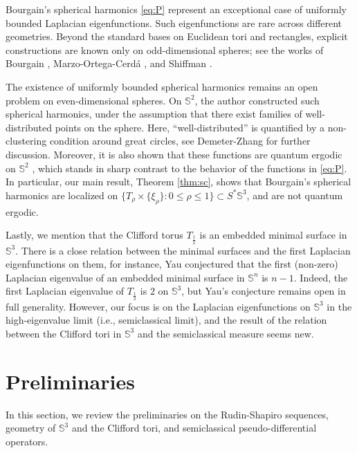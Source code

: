 \documentclass[12pt,reqno]{amsart}
\newcommand\Sb{\mathbb{S}}
\theoremstyle{plain}
\theoremstyle{remark}
\numberwithin{equation}{section}
\begin{document}
Bourgain’s spherical harmonics \eqref{eq:P} represent an exceptional case of uniformly bounded Laplacian eigenfunctions. Such eigenfunctions are rare across different geometries. Beyond the standard bases on Euclidean tori and rectangles, explicit constructions are known only on odd-dimensional spheres; see the works of Bourgain \cite{B1, B2}, Marzo-Ortega-Cerd\'a \cite{MOC}, and Shiffman \cite{Sh}. 

The existence of uniformly bounded spherical harmonics remains an open problem on even-dimensional spheres. On $\Sb^2$, the author \cite{H} constructed such spherical harmonics, under the assumption that there exist families of well-distributed points on the sphere. Here, ``well-distributed'' is quantified by a non-clustering condition around great circles, see Demeter-Zhang \cite{DZ} for further discussion. Moreover, it is also shown that these functions are quantum ergodic on $\Sb^2$ \cite{H}, which stands in sharp contrast to the behavior of the functions in \eqref{eq:P}. In particular,
our main result, Theorem \ref{thm:sc}, shows that Bourgain's spherical harmonics are localized on $\{T_\rho\times\{\xi_\rho\}:0\le\rho\le1\}\subset S^*\Sb^3$, and are not quantum ergodic.

Lastly, we mention that the Clifford torus $T_\frac12$ is an embedded minimal surface in $\Sb^3$. There is a close relation between the minimal surfaces and the first Laplacian eigenfunctions on them, for instance, Yau \cite[Problem 100]{Y} conjectured that the first (non-zero) Laplacian eigenvalue of an embedded minimal surface in $\Sb^n$ is $n-1$. Indeed, the first Laplacian eigenvalue of $T_\frac12$ is $2$ on $\Sb^3$, but Yau's conjecture remains open in full generality. However, our focus is on the Laplacian eigenfunctions on $\Sb^3$ in the high-eigenvalue limit (i.e., semiclassical limit), and the result of the relation between the Clifford tori in $\Sb^3$ and the semiclassical measure seems new. 

\section{Preliminaries}
In this section, we review the preliminaries on the Rudin-Shapiro sequences, geometry of $\Sb^3$ and the Clifford tori, and semiclassical pseudo-differential operators.
\end{document}

